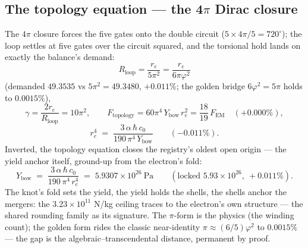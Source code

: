\documentclass[11pt, a4paper]{article}
\newcommand{\cnot}{\ensuremath{c_0}}
\newcommand{\Ybow}{\ensuremath{Y_{\mathrm{bow}}}}
\begin{document}
\subsection{The topology equation --- the 4$\pi$ Dirac closure}
The $4\pi$ closure forces the five gates onto the double circuit
($5\times4\pi/5 = 720^\circ$); the loop settles at five gates over the circuit
squared, and the torsional hold lands on exactly the balance's demand:
\begin{equation}
R_{\mathrm{loop}} = \frac{r_e}{5\pi^2} = \frac{r_e}{6\pi\varphi^2}
\end{equation}
(demanded $49.3535$ vs $5\pi^2 = 49.3480$, $+0.011\%$; the golden bridge
$6\varphi^2 = 5\pi$ holds to $0.0015\%$),
\begin{equation}
\gamma = \frac{2r_e}{R_{\mathrm{loop}}} = 10\pi^2,
\qquad
F_{\mathrm{topology}} = 60\pi^4\,\Ybow\,r_e^2 =
\frac{18}{19}\,F_{\mathrm{EM}} \quad (+0.000\%),
\end{equation}
\begin{equation}
r_e^4 \;=\; \frac{3\,\alpha\,\hbar\,\cnot}{190\,\pi^4\,\Ybow}
\qquad (-0.011\%).
\end{equation}
Inverted, the topology equation closes the registry's oldest open origin --- the
yield anchor itself, ground-up from the electron's fold:
\begin{equation}
\Ybow \;=\; \frac{3\,\alpha\,\hbar\,\cnot}{190\,\pi^4\,r_e^4}
\;=\; 5.9307\times10^{26}\ \mathrm{Pa}
\qquad (\text{locked } 5.93\times10^{26},\ +0.011\%).
\end{equation}
The knot's fold sets the yield, the yield holds the shells, the shells anchor the
mergers: the $3.23\times10^{11}$ N/kg ceiling traces to the electron's own
structure --- the shared rounding family as its signature.
The $\pi$-form is the physics (the winding count); the golden form rides the
classic near-identity $\pi\approx(6/5)\varphi^2$ to $0.0015\%$ --- the gap is
the algebraic--transcendental distance, permanent by proof.
\end{document}
